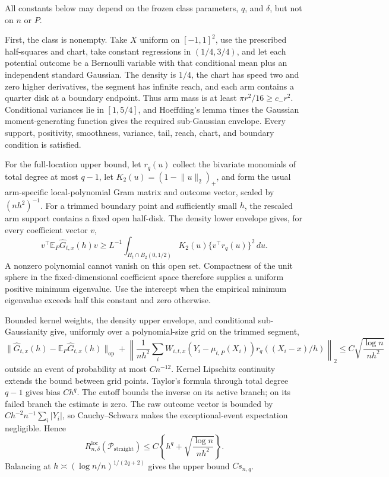 All constants below may depend on the frozen class parameters, \(q\), and \(\delta\), but not on \(n\) or \(P\).

First, the class is nonempty.  Take \(X\) uniform on \([-1,1]^2\), use the prescribed half-squares and chart, take constant regressions in \((1/4,3/4)\), and let each potential outcome be a Bernoulli variable with that conditional mean plus an independent standard Gaussian.  The density is \(1/4\), the chart has speed two and zero higher derivatives, the segment has infinite reach, and each arm contains a quarter disk at a boundary endpoint.  Thus arm mass is at least \(\pi r^2/16\geq c_-r^2\).  Conditional variances lie in \([1,5/4]\), and Hoeffding's lemma times the Gaussian moment-generating function gives the required sub-Gaussian envelope.  Every support, positivity, smoothness, variance, tail, reach, chart, and boundary condition is satisfied.

For the full-location upper bound, let \(r_q(u)\) collect the bivariate monomials of total degree at most \(q-1\), let \(K_2(u)=(1-\lVert u\rVert_2)_+\), and form the usual arm-specific local-polynomial Gram matrix and outcome vector, scaled by \((nh^2)^{-1}\).  For a trimmed boundary point and sufficiently small \(h\), the rescaled arm support contains a fixed open half-disk.  The density lower envelope gives, for every coefficient vector \(v\),
\[
v^\top\mathbb E_P\widehat G_{t,x}(h)v
\geq L^{-1}\int_{H_t\cap B_2(0,1/2)}K_2(u)\{v^\top r_q(u)\}^2\,du.
\]
A nonzero polynomial cannot vanish on this open set.  Compactness of the unit sphere in the fixed-dimensional coefficient space therefore supplies a uniform positive minimum eigenvalue.  Use the intercept when the empirical minimum eigenvalue exceeds half this constant and zero otherwise.

Bounded kernel weights, the density upper envelope, and conditional sub-Gaussianity give, uniformly over a polynomial-size grid on the trimmed segment,
\[
\lVert\widehat G_{t,x}(h)-\mathbb E_P\widehat G_{t,x}(h)\rVert_{\mathrm{op}}
+\left\lVert\frac1{nh^2}\sum_iW_{i,t,x}(Y_i-\mu_{t,P}(X_i))r_q((X_i-x)/h)\right\rVert_2
\leq C\sqrt{\frac{\log n}{nh^2}}
\]
outside an event of probability at most \(Cn^{-12}\).  Kernel Lipschitz continuity extends the bound between grid points.  Taylor's formula through total degree \(q-1\) gives bias \(Ch^q\).  The cutoff bounds the inverse on its active branch; on its failed branch the estimate is zero.  The raw outcome vector is bounded by \(Ch^{-2}n^{-1}\sum_i|Y_i|\), so Cauchy--Schwarz makes the exceptional-event expectation negligible.  Hence
\[
R_{n,\delta}^{\mathrm{loc}}(\mathcal P_{\mathrm{straight}})
\leq C\left\{h^q+\sqrt{\frac{\log n}{nh^2}}\right\}.
\]
Balancing at \(h\asymp(\log n/n)^{1/(2q+2)}\) gives the upper bound \(Cs_{n,q}\).

